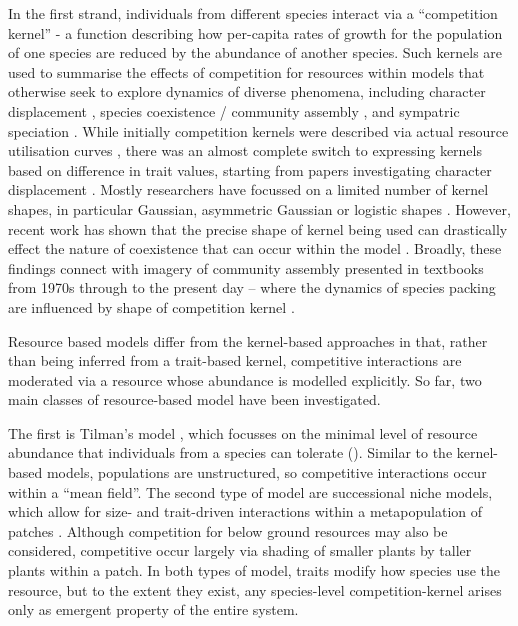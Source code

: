 \documentclass[a4paper,11pt]{article}
\begin{document}
In the first strand, individuals from different species interact via a 
``competition kernel'' -  a function describing how per-capita rates of growth
for the population of one species are reduced by the abundance of another species.
% 
Such kernels are used to summarise the effects of competition for resources within
models that otherwise seek to explore dynamics of diverse phenomena, including
character displacement \citep{Taper-1985, Case-2000}, 
species coexistence / community assembly \citet{MacArthur-1967, Calcagno-2006,
Leimar-2013}, and sympatric speciation \citep{Dieckmann-1999}.
% 
While initially competition kernels were described via actual 
resource utilisation curves \citep{MacArthur-1967,Roughgarden-1979,Abrams-1983}, 
there was an almost complete switch to expressing kernels based on difference
in trait values, starting from papers investigating character displacement
 \citep{Slatkin-1980,Taper-1985}.
%
Mostly researchers have focussed on a limited number of kernel shapes, in particular
 Gaussian, asymmetric Gaussian or logistic shapes
\cite{Taper-1985, Kisdi-1999, Dieckmann-1999, Leimar-2013}.
% 
However, recent work has shown that the precise shape of kernel being used can
drastically effect the nature of coexistence that can occur within the model 
\citep{Calcagno-2006, Scheffer-2006, Pigolotti-2007, Leimar-2013}.
%
Broadly, these findings connect with imagery of community assembly presented
in textbooks from 1970s through to the present day -- where the dynamics
of species packing are influenced by shape of competition kernel 
\citep{Krebs-1972,Ricklefs-1973,Ricklefs-1999,Krebs-2013}.

Resource based models differ from the kernel-based approaches in that, rather
than being inferred from a trait-based kernel, competitive interactions are 
moderated via a resource whose abundance is modelled explicitly.
%  
So far, two main classes of resource-based model have been investigated.

%
The first is Tilman's  \Rstar model \citep{Tilman-1977,Tilman-1982}, which focusses
on the minimal level of resource abundance that individuals from a species
can tolerate (\Rstar).
Similar to the kernel-based models, populations are unstructured, so 
competitive interactions occur within a ``mean field''.
% 
The second type of model are successional niche models, which
allow for size- and trait-driven interactions within a metapopulation of patches
\citep{Huston-1987,Kohyama-1993,Moorcroft-2001,Falster-2011}.
Although competition for below ground resources may also be considered, 
competitive occur largely via shading of smaller plants by taller plants within
a patch. 
In both types of model, traits modify how species use the resource, but to the
extent they exist,  any species-level competition-kernel arises only as emergent property
of the entire system.
\end{document}
